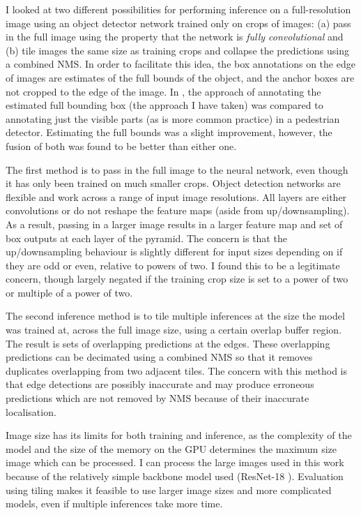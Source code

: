 I looked at two different possibilities for performing inference on a full-resolution image using an object detector network trained only on crops of images: (a) pass in the full image using the property that the network is \emph{fully convolutional} and (b) tile images the same size as training crops and collapse the predictions using a combined \gls{NMS}. In order to facilitate this idea, the box annotations on the edge of images are estimates of the full bounds of the object, and the anchor boxes are not cropped to the edge of the image. In \cite{Duarte2010}, the approach of annotating the estimated full bounding box (the approach I have taken) was compared to annotating just the visible parts (as is more common practice) in a pedestrian detector. Estimating the full bounds was a slight improvement, however, the fusion of both was found to be better than either one. 

The first method is to pass in the full image to the neural network, even though it has only been trained on much smaller crops. Object detection networks are flexible and work across a range of input image resolutions. All layers are either convolutions or do not reshape the feature maps (aside from up/downsampling). As a result, passing in a larger image results in a larger feature map and set of box outputs at each layer of the pyramid. The concern is that the up/downsampling behaviour is slightly different for input sizes depending on if they are odd or even, relative to powers of two. I found this to be a legitimate concern, though largely negated if the training crop size is set to a power of two or multiple of a power of two. 

The second inference method is to tile multiple inferences at the size the model was trained at, across the full image size, using a certain overlap buffer region. The result is sets of overlapping predictions at the edges. These overlapping predictions can be decimated using a combined \gls{NMS} so that it removes duplicates overlapping from two adjacent tiles. The concern with this method is that edge detections are possibly inaccurate and may produce erroneous predictions which are not removed by \gls{NMS} because of their inaccurate localisation. 

Image size has its limits for both training and inference, as the complexity of the model and the size of the memory on the \gls{GPU} determines the maximum size image which can be processed. I can process the large images used in this work because of the relatively simple backbone model used (ResNet-18 \cite{He}). Evaluation using tiling makes it feasible to use larger image sizes and more complicated models, even if multiple inferences take more time.


